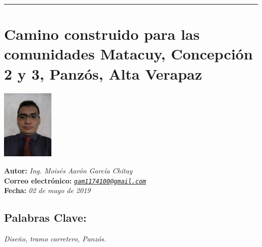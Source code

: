 \documentclass[12pt,spanish,Letterpaper,openany]{book}
\newcommand{\tcolorboxcommand}{\begin{tcolorbox}[sharp corners=uphill, colback=newfondo, colframe=newfondo, arc=6mm, boxrule=0mm, boxsep=0mm]}
\newcommand{\HRule}{\begin{center}\rule{0.5\linewidth}{0.2mm}\end{center}}
\begin{document}
\medskip

\HRule

\medskip

\hypertarget{mgarcia}{%
\chapter{Camino construido para las comunidades Matacuy, Concepción 2 y 3, Panzós, Alta Verapaz}\label{mgarcia}}

\begin {flushleft}

\tcolorboxcommand

\begin{minipage}[c]{3cm}

\includegraphics[width=2.5cm,height=\textheight]{images/image00_mgarcia.jpg}

\end{minipage}\begin{minipage}[c]{12cm}

\textbf{Autor:} \emph{Ing. Moisés Aarón García Chitay}\\
\textbf{Correo electrónico:} \emph{\href{mailto:gam1174100@gmail.com}{\nolinkurl{gam1174100@gmail.com}}}\\
\textbf{Fecha:} \emph{02 de mayo de 2019}

\end{minipage}

\end {tcolorbox}

\end {flushleft}

\hypertarget{palabras-clave}{%
\section*{Palabras Clave:}\label{palabras-clave}}

\emph{Diseño, tramo carretero, Panzós.}
\end{document}
